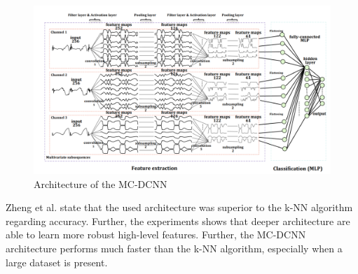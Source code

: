 \begin{figure}[h]
	\centering
	\includegraphics[scale=0.35]{Figures/MC-DCNN}
	\decoRule
	\caption[Architecture of the MC-DCNN]{Architecture of the MC-DCNN \parencite{Zheng2014}}
	\label{fig:MC-DCNN}
\end{figure}

Zheng et al. state that the used architecture was superior to the k-NN algorithm regarding accuracy. Further, the experiments shows that deeper architecture are able to learn more robust high-level features. Further, the MC-DCNN architecture performs much faster than the k-NN algorithm, especially when a large dataset is present. 

